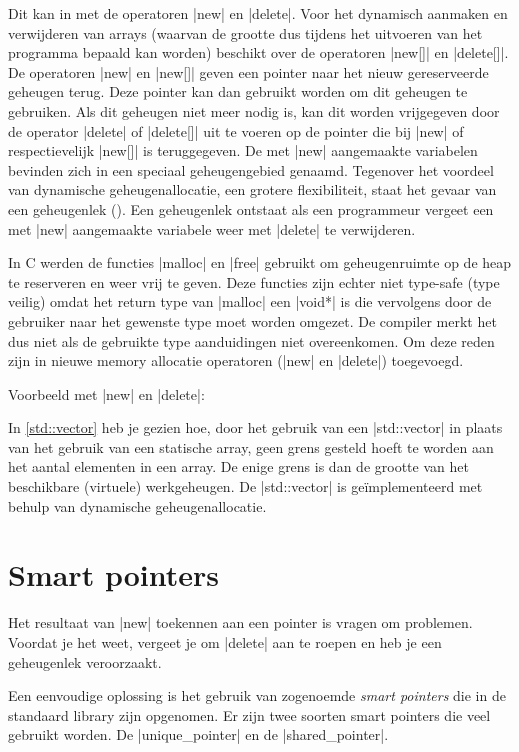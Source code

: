 \begin{cpplstShortInline}
Dit kan in \Cpp{} met de operatoren |new| en |delete|.
Voor het dynamisch aanmaken en verwijderen van arrays (waarvan de grootte dus tijdens het uitvoeren van het programma bepaald kan worden) beschikt \Cpp{} over de operatoren |new[]| en |delete[]|. 
De operatoren |new| en |new[]| geven een pointer naar het nieuw gereserveerde geheugen terug.
Deze pointer kan dan gebruikt worden om dit geheugen te gebruiken.
Als dit geheugen niet meer nodig is, kan dit worden vrijgegeven door de operator |delete| of |delete[]| uit te voeren op de pointer die bij |new| of respectievelijk |new[]| is teruggegeven.
De met |new| aangemaakte variabelen bevinden zich in een speciaal geheugengebied \emph{}\label{heap} genaamd.
Tegenover het voordeel van dynamische geheugenallocatie, een grotere flexibiliteit, staat het gevaar van een geheugenlek ().
Een geheugenlek ontstaat als een programmeur vergeet een met |new| aangemaakte variabele weer met |delete| te verwijderen.

In C werden de functies |malloc| en |free| gebruikt om geheugenruimte op de heap te reserveren en weer vrij te geven.
Deze functies zijn echter niet type-safe (type veilig) omdat het return type van |malloc| een |void*| is die vervolgens door de gebruiker naar het gewenste type moet worden omgezet.
De compiler merkt het dus niet als de gebruikte type aanduidingen niet overeenkomen. 
Om deze reden zijn in \Cpp{} nieuwe memory allocatie operatoren (|new| en |delete|) toegevoegd.

Voorbeeld met |new| en |delete|:

In \cref{std::vector} heb je gezien hoe, door het gebruik van een |std::vector| in plaats van het gebruik van een statische array, geen grens gesteld hoeft te worden aan het aantal elementen in een array. 
De enige grens is dan de grootte van het beschikbare (virtuele) werkgeheugen.
De |std::vector| is geïmplementeerd met behulp van dynamische geheugenallocatie.

\section{Smart pointers}
Het resultaat van |new| toekennen aan een  pointer is vragen om problemen.
Voordat je het weet, vergeet je om |delete| aan te roepen en heb je een geheugenlek veroorzaakt. 

Een eenvoudige oplossing is het gebruik van zogenoemde \emph{smart pointers} die in de standaard library zijn opgenomen.
Er zijn twee soorten smart pointers die veel gebruikt worden.
De |unique_pointer| en de |shared_pointer|.


\end{cpplstShortInline}

